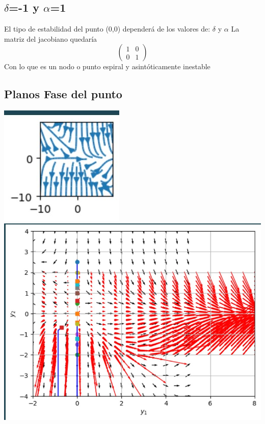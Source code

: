 \documentclass{article}
\begin{document}
      \subsection*{$\delta$=-1 y $\alpha$=1}
        El tipo de estabilidad del punto (0,0) dependerá de los valores de: $\delta$ y $\alpha$
        La matriz del jacobiano quedaría
        \[
         \left(
         \begin{array}{lc}
           1 & 0\\
           0 & 1
         \end{array}
         \right)
         \]         
         Con lo que es un nodo o punto espiral y asintóticamente inestable
         \subsection*{Planos Fase del punto }
         \noindent
         \includegraphics{isoclinas 2jpg.jpg}
          \includegraphics{Campo vectorail de d=-1 a1 .jpg}
        
\end{document}
